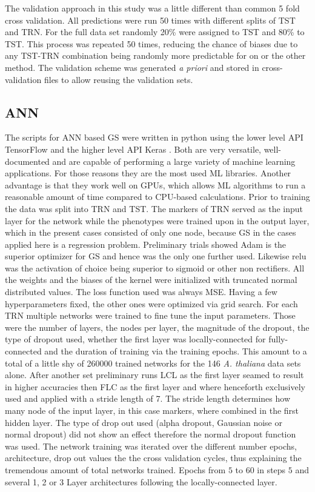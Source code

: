 The validation approach in this study was a little different than common 5 fold cross validation. All
predictions were run 50 times with different splits of TST and TRN. For the full data set randomly 20\% were
assigned to TST and 80\% to TST. This process was repeated 50 times, reducing the chance of biases due to any
TST-TRN combination being randomly more predictable for on or the other method. The validation scheme was
generated \textit{a priori} and stored in cross-validation files to allow reusing the validation sets.


\subsection{ANN}
The scripts for ANN based GS were written in python using the lower level API TensorFlow \cite{TF2016} and the
higher level API Keras \cite{keras2015}. Both are very versatile, well-documented and are capable of
performing a large variety of machine learning applications. For those reasons they are the most used ML
libraries. Another advantage is that they work well on GPUs, which allows ML algorithms to run a reasonable
amount of time compared to CPU-based calculations. Prior to training the data was split into TRN and TST. The
markers of TRN served as the input layer for the network while the phenotypes were trained upon in the output
layer, which in the present cases consisted of only one node, because GS in the cases applied here is a
regression problem.  Preliminary trials showed Adam is the superior optimizer for GS and hence was the only
one further used. Likewise relu was the activation of choice being superior to sigmoid or other non
rectifiers. All the weights and the biases of the kernel were initialized with truncated normal distributed
values. The loss function used was always MSE. \newline Having a few hyperparameters fixed, the other ones
were optimized via grid search.  For each TRN multiple networks were trained to fine tune the input
parameters. Those were the number of layers, the nodes per layer, the magnitude of the dropout, the type of
dropout used, whether the first layer was locally-connected for fully-connected and the duration of training
via the training epochs. This amount to a total of a little shy of 260000 trained networks for the 146
\textit{A. thaliana} data sets alone. \newline After another set preliminary runs LCL as the first layer
seamed to result in higher accuracies then FLC as the first layer and where henceforth exclusively used and
applied with a stride length of 7. The stride length determines how many node of the input layer, in this case
markers, where combined in the first hidden layer.  The type of drop out used (alpha dropout, Gaussian noise
or normal dropout) did not show an effect therefore the normal dropout function was used.  The network
training was iterated over the different number epochs, architecture, drop out values the the cross validation
cycles, thus explaining the tremendous amount of total networks trained. Epochs from $5$ to $60$ in steps $5$
and several 1, 2 or 3 Layer architectures following the locally-connected layer.

